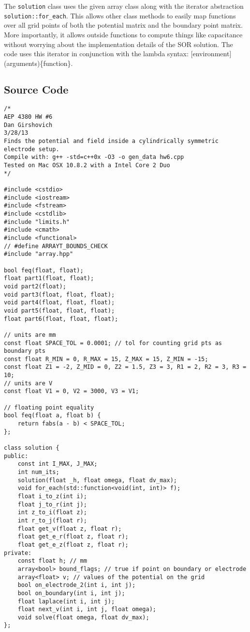 \documentclass[12pt]{article}
\begin{document}
The \texttt{solution} class uses the given array class along with the iterator abstraction \texttt{solution::for\_each}. This allows other class methods to easily map functions over all grid points of both the potential matrix and the boundary point matrix. More importantly, it allows outside functions to compute things like capacitance without worrying about the implementation details of the SOR solution. The code uses this iterator in conjunction with the lambda syntax: {[}environment{]}(arguments)\{function\}.
\subsection{Source Code}
\begin{lstlisting}
/*
AEP 4380 HW #6
Dan Girshovich
3/28/13
Finds the potential and field inside a cylindrically symmetric electrode setup.
Compile with: g++ -std=c++0x -O3 -o gen_data hw6.cpp
Tested on Mac OSX 10.8.2 with a Intel Core 2 Duo
*/

#include <cstdio>
#include <iostream>
#include <fstream>
#include <cstdlib>
#include "limits.h"
#include <cmath>
#include <functional>
// #define ARRAYT_BOUNDS_CHECK
#include "array.hpp"

bool feq(float, float);
float part1(float, float);
void part2(float);
void part3(float, float, float);
void part4(float, float, float);
void part5(float, float, float);
float part6(float, float, float);

// units are mm
const float SPACE_TOL = 0.0001; // tol for counting grid pts as boundary pts
const float R_MIN = 0, R_MAX = 15, Z_MAX = 15, Z_MIN = -15;
const float Z1 = -2, Z_MID = 0, Z2 = 1.5, Z3 = 3, R1 = 2, R2 = 3, R3 = 10;
// units are V
const float V1 = 0, V2 = 3000, V3 = V1;

// floating point equality
bool feq(float a, float b) {
    return fabs(a - b) < SPACE_TOL;
};

class solution {
public:
    const int I_MAX, J_MAX;
    int num_its;
    solution(float _h, float omega, float dv_max);
    void for_each(std::function<void(int, int)> f);
    float i_to_z(int i);
    float j_to_r(int j);
    int z_to_i(float z);
    int r_to_j(float r);
    float get_v(float z, float r);
    float get_e_r(float z, float r);
    float get_e_z(float z, float r);
private:
    const float h; // mm
    array<bool> bound_flags; // true if point on boundary or electrode
    array<float> v; // values of the potential on the grid
    bool on_electrode_2(int i, int j);
    bool on_boundary(int i, int j);
    float laplace(int i, int j);
    float next_v(int i, int j, float omega);
    void solve(float omega, float dv_max);
};


\end{lstlisting}
\end{document}
